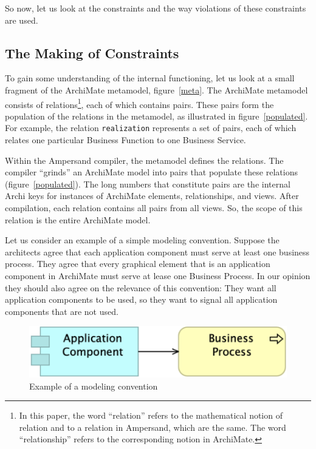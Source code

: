 \documentclass[sn-vancouver]{sn-jnl}%
\theoremstyle{thmstyleone}%
\theoremstyle{thmstyletwo}%
\theoremstyle{thmstylethree}%
\begin{document}
So now, let us look at the constraints and the way violations of these constraints are used.

\subsection{The Making of Constraints}\label{Analyzing Models}
To gain some understanding of the internal functioning,
let us look at a small fragment of the ArchiMate metamodel, figure~\ref{meta}.
The ArchiMate metamodel consists of relations\footnote{In this paper, the word ``relation'' refers to the mathematical notion of relation and to a relation in Ampersand, which are the same.
The word ``relationship'' refers to the corresponding notion in ArchiMate.}, each of which contains pairs.
These pairs form the population of the relations in the metamodel, as illustrated in figure~\ref{populated}.
For example, the relation \verb#realization# represents a set of pairs,
each of which relates one particular Business Function to one Business Service.

Within the Ampersand compiler, the metamodel defines the relations.
The compiler ``grinds'' an ArchiMate model into pairs that populate these relations (figure~\ref{populated}).
The long numbers that constitute pairs are the internal Archi keys for instances of ArchiMate elements, relationships, and views.
After compilation, each relation contains all pairs from all views.
So, the scope of this relation is the entire ArchiMate model.

Let us consider an example of a simple modeling convention.
Suppose the architects agree that each application component must serve at least one business process.
They agree that every graphical element that is an application component in ArchiMate must serve at lease one Business Process.
In our opinion they should also agree on the relevance of this convention:
They want all application components to be used,
so they want to signal all application components that are not used.
\begin{figure}[hbtp]
\centering
\includegraphics[clip=true, scale=0.4]{policy3}
\caption{\small Example of a modeling convention}
\label{Policy3}
\end{figure}
\end{document}
